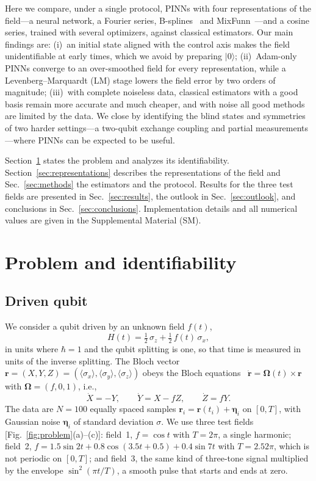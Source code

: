 \documentclass[aps,pra,twocolumn,superscriptaddress,10pt,longbibliography,floatfix]{revtex4-2}
\newcommand{\rvec}{\bm r}
\begin{document}
Here we compare, under a single protocol, PINNs with four representations of the field---a neural
network, a Fourier series, B-splines~\cite{deboor2001splines} and MixFunn~\cite{farias2025mixfunn}---and
a cosine series, trained with several optimizers, against classical estimators. Our main findings are:
(i)~an initial state aligned with the control axis makes the field unidentifiable at early times, which
we avoid by preparing $|0\rangle$; (ii)~Adam-only PINNs converge to an over-smoothed field for every
representation, while a Levenberg--Marquardt (LM) stage lowers the field error by two orders of
magnitude; (iii)~with complete noiseless data, classical estimators with a good basis remain more
accurate and much cheaper, and with noise all good methods are limited by the data. We close by
identifying the blind states and symmetries of two harder settings---a two-qubit exchange coupling and
partial measurements---where PINNs can be expected to be useful.

Section~\ref{sec:problem} states the problem and analyzes its identifiability.
Section~\ref{sec:representations} describes the representations of the field and
Sec.~\ref{sec:methods} the estimators and the protocol. Results for the three test fields are presented
in Sec.~\ref{sec:results}, the outlook in Sec.~\ref{sec:outlook}, and conclusions in
Sec.~\ref{sec:conclusions}. Implementation details and all numerical values are given in the
Supplemental Material (SM).

\section{Problem and identifiability}\label{sec:problem}

\subsection{Driven qubit}
We consider a qubit driven by an unknown field $f(t)$,
\begin{equation}
  H(t) = \tfrac12\,\sigma_z + \tfrac12\, f(t)\,\sigma_x ,
  \label{eq:H}
\end{equation}
in units where $\hbar=1$ and the qubit splitting is one, so that time is measured in units of the
inverse splitting. The Bloch vector $\rvec=(X,Y,Z)=(\langle\sigma_x\rangle,\langle\sigma_y\rangle,
\langle\sigma_z\rangle)$ obeys the Bloch equations~\cite{bloch1946,nielsen2010qcqi}
$\dot{\rvec} = \bm\Omega(t)\times\rvec$ with $\bm\Omega=(f,0,1)$, i.e.,
\begin{equation}
  \dot X = -Y,\qquad \dot Y = X - f Z,\qquad \dot Z = f Y .
  \label{eq:bloch}
\end{equation}
The data are $N=100$ equally spaced samples $\rvec_i=\rvec(t_i)+\bm\eta_i$ on $[0,T]$, with Gaussian noise
$\bm\eta_i$ of standard deviation $\sigma$. We use three test fields [Fig.~\ref{fig:problem}(a)--(c)]:
field~1, $f=\cos t$ with $T=2\pi$, a single harmonic; field~2,
$f=1.5\sin2t+0.8\cos(3.5t+0.5)+0.4\sin7t$ with $T=2.52\pi$, which is not periodic on $[0,T]$; and
field~3, the same kind of three-tone signal multiplied by the envelope $\sin^2(\pi t/T)$, a smooth pulse
that starts and ends at zero.
\end{document}
